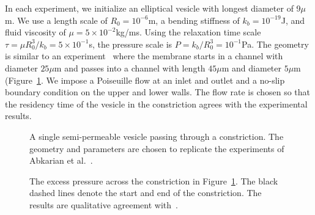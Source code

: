 \documentclass[9pt,twocolumn,twoside,lineno]{pnas-new}
\newif\ifTikz
\begin{document}
In each experiment, we initialize an elliptical vesicle with longest
diameter of 9$\mu$m. We use a length scale of $R_0 = 10^{-6}$m, a
bending stiffness of $k_b = 10^{-19}$J, and fluid viscosity of $\mu=5
\times 10^{-2}$kg/ms. Using the relaxation time scale $\tau = \mu
R_0^3/k_b = 5 \times 10^{-1}$s, the pressure scale is $P = k_b/R_0^3 =
10^{-1}$Pa. The geometry is similar to an
experiment~\cite{abk-fai-sto2006} where the membrane starts in a channel
with diameter $25\mu$m and passes into a channel with length $45\mu$m
and diameter $5\mu$m (Figure~\ref{fig:stenosisGeom}. We impose a
Poiseuille flow at an inlet and outlet and a no-slip boundary condition
on the upper and lower walls. The flow rate is chosen so that the
residency time of the vesicle in the constriction agrees with the
experimental results.

\begin{figure}[htp]
  \ifTikz
  
  \fi
  \caption{\label{fig:stenosisGeom} A single semi-permeable vesicle
  passing through a constriction. The geometry and parameters are chosen
  to replicate the experiments of Abkarian et
  al.~\cite{abk-fai-sto2006}.}
\end{figure}

\begin{figure}[htp]
  \ifTikz
  
  \fi
  \caption{\label{fig:stenosisPressure} The excess pressure across the
  constriction in Figure~\ref{fig:stenosisGeom}. The black dashed lines
  denote the start and end of the constriction. The results are
  qualitative agreement with~\cite{abk-fai-sto2006}.}
\end{figure}




% 
 
\end{document}
